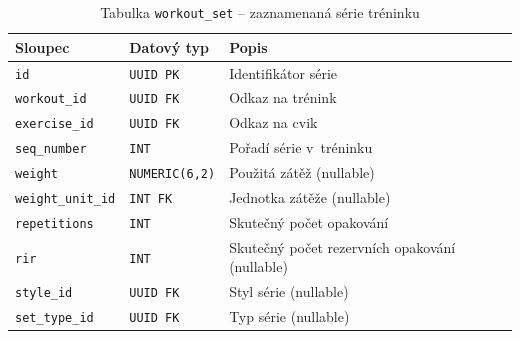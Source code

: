 \begin{table}[htbp]
    \centering
    \caption{Tabulka \texttt{workout\_set} -- zaznamenaná série tréninku}
    \label{tab:workout-set}
    \begin{tabular}{|p{4.2cm}|p{3.2cm}|p{6.8cm}|}
        \hline
        \textbf{Sloupec}          & \textbf{Datový typ}   & \textbf{Popis}                                 \\
        \hline
        \texttt{id}               & \texttt{UUID PK}      & Identifikátor série                            \\
        \hline
        \texttt{workout\_id}      & \texttt{UUID FK}      & Odkaz na trénink                               \\
        \hline
        \texttt{exercise\_id}     & \texttt{UUID FK}      & Odkaz na cvik                                  \\
        \hline
        \texttt{seq\_number}      & \texttt{INT}          & Pořadí série v~tréninku                        \\
        \hline
        \texttt{weight}           & \texttt{NUMERIC(6,2)} & Použitá zátěž (nullable)                       \\
        \hline
        \texttt{weight\_unit\_id} & \texttt{INT FK}       & Jednotka zátěže (nullable)                     \\
        \hline
        \texttt{repetitions}      & \texttt{INT}          & Skutečný počet opakování                       \\
        \hline
        \texttt{rir}              & \texttt{INT}          & Skutečný počet rezervních opakování (nullable) \\
        \hline
        \texttt{style\_id}        & \texttt{UUID FK}      & Styl série (nullable)                          \\
        \hline
        \texttt{set\_type\_id}    & \texttt{UUID FK}      & Typ série (nullable)                           \\
        \hline
    \end{tabular}
\end{table}